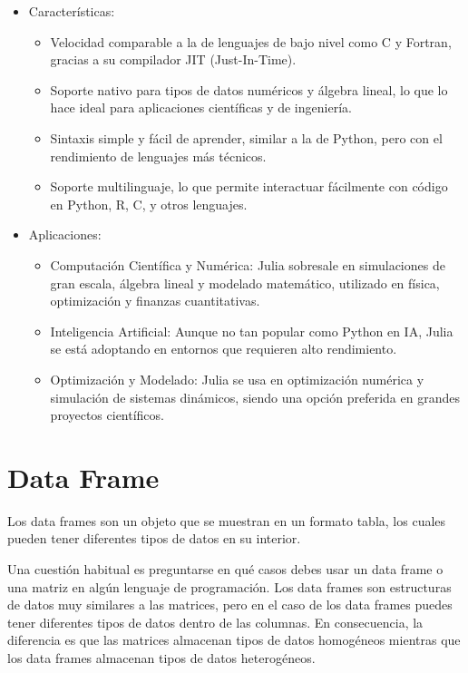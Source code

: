 \documentclass[
  us-letterpaper,
]{scrreprt}
\theoremstyle{plain}
\theoremstyle{plain}
\theoremstyle{definition}
\theoremstyle{remark}
\begin{document}
\begin{itemize}
\item
  Características:

  \begin{itemize}
  \item
    Velocidad comparable a la de lenguajes de bajo nivel como C y
    Fortran, gracias a su compilador JIT (Just-In-Time).
  \item
    Soporte nativo para tipos de datos numéricos y álgebra lineal, lo
    que lo hace ideal para aplicaciones científicas y de ingeniería.
  \item
    Sintaxis simple y fácil de aprender, similar a la de Python, pero
    con el rendimiento de lenguajes más técnicos.
  \item
    Soporte multilinguaje, lo que permite interactuar fácilmente con
    código en Python, R, C, y otros lenguajes.
  \end{itemize}
\item
  Aplicaciones:

  \begin{itemize}
  \item
    Computación Científica y Numérica: Julia sobresale en simulaciones
    de gran escala, álgebra lineal y modelado matemático, utilizado en
    física, optimización y finanzas cuantitativas.
  \item
    Inteligencia Artificial: Aunque no tan popular como Python en IA,
    Julia se está adoptando en entornos que requieren alto rendimiento.
  \item
    Optimización y Modelado: Julia se usa en optimización numérica y
    simulación de sistemas dinámicos, siendo una opción preferida en
    grandes proyectos científicos.
  \end{itemize}
\end{itemize}

\section{Data Frame}\label{sec-dataframe}

Los data frames son un objeto que se muestran en un formato tabla, los
cuales pueden tener diferentes tipos de datos en su interior.

Una cuestión habitual es preguntarse en qué casos debes usar un data
frame o una matriz en algún lenguaje de programación. Los data frames
son estructuras de datos muy similares a las matrices, pero en el caso
de los data frames puedes tener diferentes tipos de datos dentro de las
columnas. En consecuencia, la diferencia es que las matrices almacenan
tipos de datos homogéneos mientras que los data frames almacenan tipos
de datos heterogéneos.
\end{document}
